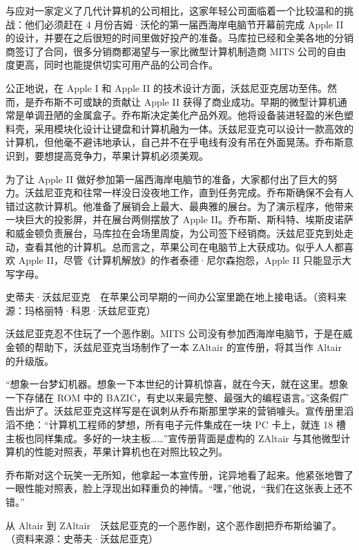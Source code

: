\documentclass[12pt,UTF8]{ctexbook}
\begin{document}
与应对一家定义了几代计算机的公司相比，这家年轻公司面临着一个比较温和的挑战：他们必须赶在 4 月份吉姆·沃伦的第一届西海岸电脑节开幕前完成 Apple II 的设计，并要在之后很短的时间里做好投产的准备。马库拉已经和全美各地的分销商签订了合同，很多分销商都渴望与一家比微型计算机制造商 MITS 公司的自由度更高，同时也能提供切实可用产品的公司合作。

公正地说，在 Apple I 和 Apple II 的技术设计方面，沃兹尼亚克居功至伟。然而，是乔布斯不可或缺的贡献让 Apple II 获得了商业成功。早期的微型计算机通常是单调丑陋的金属盒子。乔布斯决定美化产品外观。他将设备装进轻盈的米色塑料壳，采用模块化设计让键盘和计算机融为一体。沃兹尼亚克可以设计一款高效的计算机，但他毫不避讳地承认，自己并不在乎电线有没有吊在外面晃荡。乔布斯意识到，要想提高竞争力，苹果计算机必须美观。

为了让 Apple II 做好参加第一届西海岸电脑节的准备，大家都付出了巨大的努力。沃兹尼亚克和往常一样没日没夜地工作，直到任务完成。乔布斯确保不会有人错过这款计算机。他准备了展销会上最大、最典雅的展台。为了演示程序，他带来一块巨大的投影屏，并在展台两侧摆放了 Apple II。乔布斯、斯科特、埃斯皮诺萨和威金顿负责展台，马库拉在会场里周旋，为公司签下经销商。沃兹尼亚克到处走动，查看其他的计算机。总而言之，苹果公司在电脑节上大获成功。似乎人人都喜欢 Apple II，尽管《计算机解放》的作者泰德·尼尔森抱怨，Apple II 只能显示大写字母。



史蒂夫·沃兹尼亚克　在苹果公司早期的一间办公室里跪在地上接电话。（资料来源：玛格丽特·科恩·沃兹尼亚克）

沃兹尼亚克忍不住玩了一个恶作剧。MITS 公司没有参加西海岸电脑节，于是在威金顿的帮助下，沃兹尼亚克当场制作了一本 ZAltair 的宣传册，将其当作 Altair 的升级版。

“想象一台梦幻机器。想象一下本世纪的计算机惊喜，就在今天，就在这里。想象一下存储在 ROM 中的 BAZIC，有史以来最完整、最强大的编程语言。”这条假广告出炉了。沃兹尼亚克这样写是在讽刺从乔布斯那里学来的营销噱头。宣传册里滔滔不绝：“计算机工程师的梦想，所有电子元件集成在一块 PC 卡上，就连 18 槽主板也同样集成。多好的一块主板……”宣传册背面是虚构的 ZAltair 与其他微型计算机的性能对照表，苹果计算机也在对照比较之列。

乔布斯对这个玩笑一无所知，他拿起一本宣传册，诧异地看了起来。他紧张地瞥了一眼性能对照表，脸上浮现出如释重负的神情。“嘿，”他说，“我们在这张表上还不错。”



从 Altair 到 ZAltair　沃兹尼亚克的一个恶作剧，这个恶作剧把乔布斯给骗了。（资料来源：史蒂夫·沃兹尼亚克）
\end{document}
